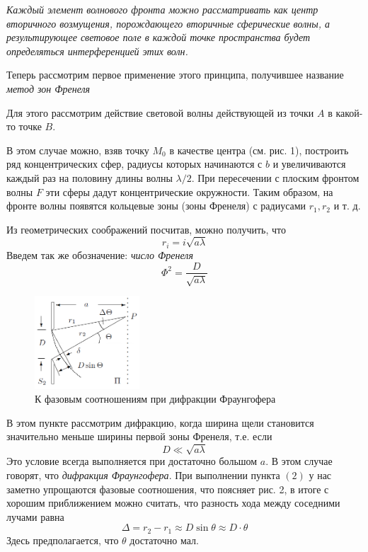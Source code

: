 \documentclass[a4paper, 12pt]{article}%
\begin{document}
\textit{Каждый элемент волнового фронта можно рассматривать как центр  вторичного возмущения, порождающего вторичные сферические волны, а результирующее световое поле  в каждой точке пространства будет определяться интерференцией этих волн.}

Теперь рассмотрим первое применение этого принципа, получившее название \textit{метод зон Френеля}

Для этого рассмотрим действие световой волны действующей из точки $A$ в какой-то точке $B$.

В этом случае можно, взяв точку $M_0$ в качестве центра (см. рис. 1), построить ряд концентрических сфер, радиусы которых начинаются с $b$ и увеличиваются каждый раз на половину длины волны $\lambda/2$. При пересечении с плоским фронтом волны $F$ эти сферы дадут концентрические окружности. Таким образом, на фронте волны появятся кольцевые зоны (зоны Френеля) с радиусами $r_1, r_2$ и т. д.

Из геометрических соображений посчитав, можно получить, что 
\begin{equation}
r_i = i \sqrt{a \lambda}
\end{equation}	
Введем так же обозначение: \textit{число Френеля}
\begin{equation}
\Phi^2 = \dfrac{D}{\sqrt{a\lambda}}
\end{equation}
\begin{figure}
  \begin{center}
    \includegraphics[width = 0.35\textwidth]{1.png}
  \end{center}
  \caption{К фазовым соотношениям при дифракции Фраунгофера}
\end{figure}
В этом пункте рассмотрим дифракцию, когда ширина щели становится значительно меньше ширины первой зоны Френеля, т.е. если 
\begin{equation}
D \ll\sqrt{a \lambda} 
\end{equation}	
Это условие всегда выполняется при достаточно большом $a$. В этом случае говорят, что \textit{дифракция Фраунгофера}. При выполнении пункта $(2)$ у нас заметно упрощаются фазовые соотношения, что поясняет рис. 2, в итоге с хорошим приближением можно считать, что разность хода между соседними лучами равна 
\begin{equation}
\Delta = r_2 - r_1 \approx D \sin \theta \approx D \cdot \theta
\end{equation}
Здесь предполагается, что $\theta$ достаточно мал.
\end{document}
